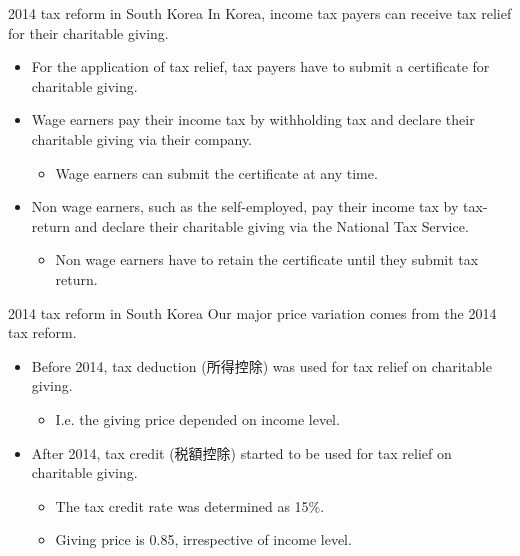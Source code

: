 \documentclass[dvipdfmx,10pt]{beamer}
\begin{document}
	\begin{frame}{2014 tax reform in South Korea}
		\protect\hypertarget{tax-reform-in-south-korea}{}
		In Korea, income tax payers can receive tax relief for their charitable giving.
		
		\begin{itemize}
			\item
			For the application of tax relief, tax payers have to submit a certificate for charitable giving.
			\item
			Wage earners pay their income tax by withholding tax and declare their charitable giving via their company.
			
			\begin{itemize}
				\item
				Wage earners can submit the certificate at any time.
			\end{itemize}
			\item
			Non wage earners, such as the self-employed, pay their income tax by tax-return and declare their charitable giving via the National Tax Service.
			
			\begin{itemize}
				\item
				Non wage earners have to retain the certificate until they submit tax return.
			\end{itemize}
		\end{itemize}
	\end{frame}
	
	\begin{frame}{2014 tax reform in South Korea}
		\protect\hypertarget{tax-reform-in-south-korea-1}{}
		Our major price variation comes from the 2014 tax reform.
		
		\begin{itemize}
			\item
			Before 2014, tax deduction (所得控除) was used for tax relief on charitable giving.
			
			\begin{itemize}
				\item
				I.e. the giving price depended on income level.
			\end{itemize}
			\item
			After 2014, tax credit (税額控除) started to be used for tax relief on charitable giving.
			
			\begin{itemize}
				\item
				The tax credit rate was determined as 15\%.
				\item
				Giving price is 0.85, irrespective of income level.
			\end{itemize}
		\end{itemize}
	\end{frame}
	
\end{document}
